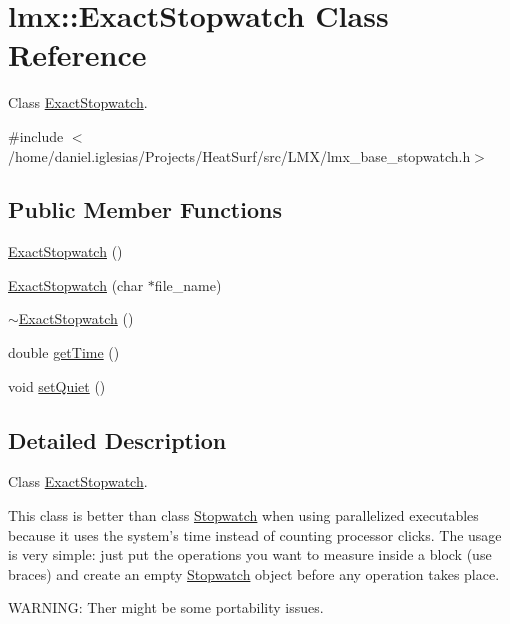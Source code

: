 \hypertarget{classlmx_1_1ExactStopwatch}{\section{lmx\-:\-:Exact\-Stopwatch Class Reference}
\label{classlmx_1_1ExactStopwatch}
}


Class \hyperlink{classlmx_1_1ExactStopwatch}{Exact\-Stopwatch}.  




{\ttfamily \#include $<$/home/daniel.\-iglesias/\-Projects/\-Heat\-Surf/src/\-L\-M\-X/lmx\-\_\-base\-\_\-stopwatch.\-h$>$}

\subsection*{Public Member Functions}
\begin{DoxyCompactItemize}
\item 
\hyperlink{classlmx_1_1ExactStopwatch_aa12454debea1b8a06ab341a97d512151}{Exact\-Stopwatch} ()
\item 
\hyperlink{classlmx_1_1ExactStopwatch_a9e32f35010bfa1d8458a478c07eb3004}{Exact\-Stopwatch} (char $\ast$file\-\_\-name)
\item 
\hyperlink{classlmx_1_1ExactStopwatch_adc45924bf093d04497e478c5ec90ae7d}{$\sim$\-Exact\-Stopwatch} ()
\item 
double \hyperlink{classlmx_1_1ExactStopwatch_aba5aa37410f9774546788b255d52c453}{get\-Time} ()
\item 
void \hyperlink{classlmx_1_1ExactStopwatch_adb2ba9de970c1ad9b7ba536eced4121a}{set\-Quiet} ()
\end{DoxyCompactItemize}


\subsection{Detailed Description}
Class \hyperlink{classlmx_1_1ExactStopwatch}{Exact\-Stopwatch}. 

This class is better than class \hyperlink{classlmx_1_1Stopwatch}{Stopwatch} when using parallelized executables because it uses the system's time instead of counting processor clicks. The usage is very simple\-: just put the operations you want to measure inside a block (use braces) and create an empty \hyperlink{classlmx_1_1Stopwatch}{Stopwatch} object before any operation takes place.

W\-A\-R\-N\-I\-N\-G\-: Ther might be some portability issues.

